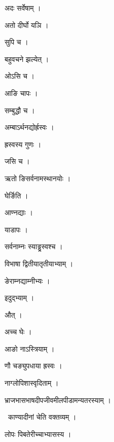 \documentclass[10pt, openany, oneside]{book}
\begin{document}
\noindent अदः सर्वेषाम् ।

\noindent अतो दीर्घो यञि ।

\noindent सुपि च ।

\noindent बहुवचने झल्येत् ।

\noindent ओऽसि च ।

\noindent आङि चापः ।

\noindent सम्बुद्धौ च ।

\noindent अम्बाऽर्थनद्योर्ह्रस्वः ।

\noindent ह्रस्वस्य गुणः ।

\noindent जसि च ।

\noindent ऋतो ङिसर्वनामस्थानयोः ।

\noindent घेर्ङिति ।

\noindent आण्नद्याः ।

\noindent याडापः ।

\noindent सर्वनाम्नः स्याड्ढ्रस्वश्च ।

\noindent विभाषा द्वितीयातृतीयाभ्याम् ।

\noindent ङेराम्नद्याम्नीभ्यः ।

\noindent इदुद्भ्याम् ।

\noindent औत् ।

\noindent अच्च घेः ।

\noindent आङो नाऽस्त्रियाम् ।

\noindent णौ चङ्युपधाया ह्रस्वः ।

\noindent नाग्लोपिशास्वृदिताम् ।

\noindent भ्राजभासभाषदीपजीवमीलपीडामन्यतरस्याम् ।

\par\noindent\hspace{1.5em}{\vps वा॰}~{\qt काण्यादीनां चेति वक्तव्यम् ।}

\noindent लोपः पिबतेरीच्चाभ्यासस्य ।
\end{document}
